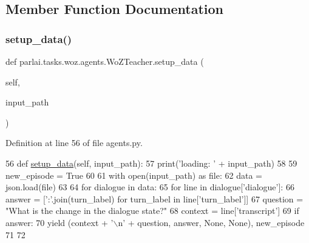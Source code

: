 \subsection{Member Function Documentation}
\mbox{\label{classparlai_1_1tasks_1_1woz_1_1agents_1_1WoZTeacher_ad0e9914e5b83842093f2ce099929b3d8}} 
\subsubsection{\texorpdfstring{setup\+\_\+data()}{setup\_data()}}
{\footnotesize\ttfamily def parlai.\+tasks.\+woz.\+agents.\+Wo\+Z\+Teacher.\+setup\+\_\+data (\begin{DoxyParamCaption}\item[{}]{self,  }\item[{}]{input\+\_\+path }\end{DoxyParamCaption})}



Definition at line 56 of file agents.\+py.


\begin{DoxyCode}
56     \textcolor{keyword}{def }\hyperlink{namespaceparlai_1_1tasks_1_1multinli_1_1agents_a4fa2cb0ba1ed745336ad8bceed36b841}{setup\_data}(self, input\_path):
57         print(\textcolor{stringliteral}{'loading: '} + input\_path)
58 
59         new\_episode = \textcolor{keyword}{True}
60 
61         with open(input\_path) \textcolor{keyword}{as} file:
62             data = json.load(file)
63 
64         \textcolor{keywordflow}{for} dialogue \textcolor{keywordflow}{in} data:
65             \textcolor{keywordflow}{for} line \textcolor{keywordflow}{in} dialogue[\textcolor{stringliteral}{'dialogue'}]:
66                 answer = [\textcolor{stringliteral}{':'}.join(turn\_label) \textcolor{keywordflow}{for} turn\_label \textcolor{keywordflow}{in} line[\textcolor{stringliteral}{'turn\_label'}]]
67                 question = \textcolor{stringliteral}{"What is the change in the dialogue state?"}
68                 context = line[\textcolor{stringliteral}{'transcript'}]
69                 \textcolor{keywordflow}{if} answer:
70                     \textcolor{keywordflow}{yield} (context + \textcolor{stringliteral}{'\(\backslash\)n'} + question, answer, \textcolor{keywordtype}{None}, \textcolor{keywordtype}{None}), new\_episode
71 
72 
\end{DoxyCode}


